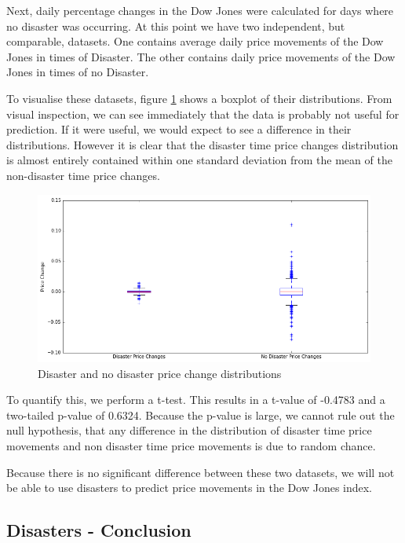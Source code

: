 \documentclass{report}
\begin{document}
Next, daily percentage changes in the Dow Jones were calculated for days where no disaster was occurring. At this point we have two independent, but comparable, datasets. One contains average daily price movements of the Dow Jones in times of Disaster. The other contains daily price movements of the Dow Jones in times of no Disaster. 

To visualise these datasets, figure \ref{fig:disaster-box} shows a boxplot of their distributions. From visual inspection, we can see immediately that the data is probably not useful for prediction. If it were useful, we would expect to see a difference in their distributions. However it is clear that the disaster time price changes distribution is almost entirely contained within one standard deviation from the mean of the non-disaster time price changes.

\begin{figure}[H]
	\caption{Disaster and no disaster price change distributions}
	\centerline{\includegraphics[width=\textwidth]{vis/disaster_box.png}}
	\label{fig:disaster-box}
\end{figure}

To quantify this, we perform a t-test. This results in a t-value of -0.4783 and a two-tailed p-value of 0.6324. Because the p-value is large, we cannot rule out the null hypothesis, that any difference in the distribution of disaster time price movements and non disaster time price movements is due to random chance.

Because there is no significant difference between these two datasets, we will not be able to use disasters to predict price movements in the Dow Jones index.

\subsection{Disasters - Conclusion}
\end{document}
